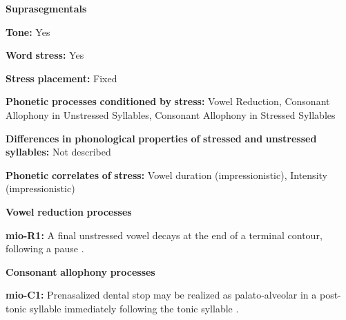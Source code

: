 \documentclass[output=paper]{langsci/langscibook}
\begin{document}
\begin{styleBody}
\textbf{Suprasegmentals}
\end{styleBody}

\begin{styleBody}
\textbf{Tone:} Yes
\end{styleBody}

\begin{styleBody}
\textbf{Word} \textbf{stress:} Yes
\end{styleBody}

\begin{styleBody}
\textbf{Stress} \textbf{placement:} Fixed
\end{styleBody}

\begin{styleBody}
\textbf{Phonetic} \textbf{processes} \textbf{conditioned} \textbf{by} \textbf{stress:} Vowel Reduction, Consonant Allophony in Unstressed Syllables, Consonant Allophony in Stressed Syllables
\end{styleBody}

\begin{styleBody}
\textbf{Differences} \textbf{in} \textbf{phonological} \textbf{properties} \textbf{of} \textbf{stressed} \textbf{and} \textbf{unstressed} \textbf{syllables:} Not described
\end{styleBody}

\begin{styleBody}
\textbf{Phonetic} \textbf{correlates} \textbf{of} \textbf{stress:} Vowel duration (impressionistic), Intensity (impressionistic)
\end{styleBody}

\begin{styleBody}
\textbf{Vowel} \textbf{reduction} \textbf{processes}
\end{styleBody}

\begin{styleBody}
\textbf{mio-R1:} A final unstressed vowel decays at the end of a terminal contour, following a pause \citep[13]{Bradley1970}.
\end{styleBody}

\begin{styleBody}
\textbf{Consonant} \textbf{allophony} \textbf{processes}
\end{styleBody}

\begin{styleBody}
\textbf{mio-C1:} Prenasalized dental stop may be realized as palato-alveolar in a post-tonic syllable immediately following the tonic syllable \citep[6]{Bradley1970}.
\end{styleBody}
\end{document}

